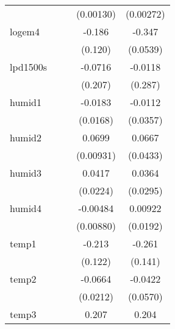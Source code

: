 {\begin{tabular}{l*{4}{c}}
            &                     &                     &   (0.00130)         &   (0.00272)         \\
[1em]
logem4      &                     &                     &      -0.186         &      -0.347\sym{***}\\
            &                     &                     &     (0.120)         &    (0.0539)         \\
[1em]
lpd1500s    &                     &                     &     -0.0716         &     -0.0118         \\
            &                     &                     &     (0.207)         &     (0.287)         \\
[1em]
humid1      &                     &                     &     -0.0183         &     -0.0112         \\
            &                     &                     &    (0.0168)         &    (0.0357)         \\
[1em]
humid2      &                     &                     &      0.0699\sym{***}&      0.0667         \\
            &                     &                     &   (0.00931)         &    (0.0433)         \\
[1em]
humid3      &                     &                     &      0.0417         &      0.0364         \\
            &                     &                     &    (0.0224)         &    (0.0295)         \\
[1em]
humid4      &                     &                     &    -0.00484         &     0.00922         \\
            &                     &                     &   (0.00880)         &    (0.0192)         \\
[1em]
temp1       &                     &                     &      -0.213         &      -0.261         \\
            &                     &                     &     (0.122)         &     (0.141)         \\
[1em]
temp2       &                     &                     &     -0.0664\sym{**} &     -0.0422         \\
            &                     &                     &    (0.0212)         &    (0.0570)         \\
[1em]
temp3       &                     &                     &       0.207\sym{***}&       0.204\sym{***}\\

\end{tabular}}
